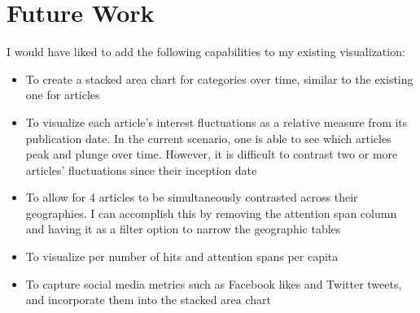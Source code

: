 \documentclass[12pt]{article}
\begin{document}
\section{Future Work}
I would have liked to add the following capabilities to my existing visualization:
\begin{itemize}
\item To create a stacked area chart for categories over time, similar to the existing one for articles
\item To visualize each article's interest fluctuations as a relative measure from its publication date. In the current scenario, one is able to see which articles peak and plunge over time. However, it is difficult to contrast two or more articles' fluctuations since their inception date
\item To allow for 4 articles to be simultaneously contrasted across their geographies. I can accomplish this by removing the attention span column and having it as a filter option to narrow the geographic tables
\item To visualize per number of hits and attention spans per capita
\item To capture social media metrics such as Facebook likes and  Twitter tweets, and incorporate them into the stacked area chart 
\end{itemize}

\newpage
\end{document}
